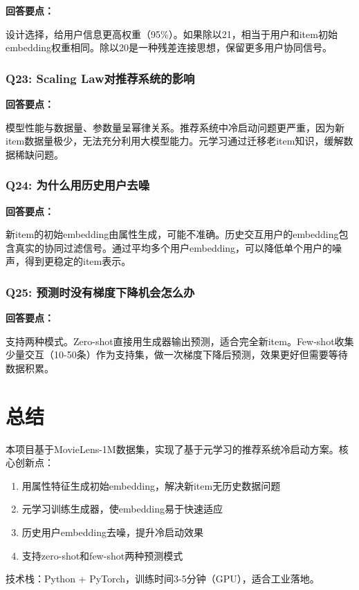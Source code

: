 \documentclass[12pt,a4paper]{article}
\begin{document}
\textbf{回答要点：}

设计选择，给用户信息更高权重（95\%）。如果除以21，相当于用户和item初始embedding权重相同。除以20是一种残差连接思想，保留更多用户协同信号。

\subsubsection{Q23: Scaling Law对推荐系统的影响}

\textbf{回答要点：}

模型性能与数据量、参数量呈幂律关系。推荐系统中冷启动问题更严重，因为新item数据量极少，无法充分利用大模型能力。元学习通过迁移老item知识，缓解数据稀缺问题。

\subsubsection{Q24: 为什么用历史用户去噪}

\textbf{回答要点：}

新item的初始embedding由属性生成，可能不准确。历史交互用户的embedding包含真实的协同过滤信号。通过平均多个用户embedding，可以降低单个用户的噪声，得到更稳定的item表示。

\subsubsection{Q25: 预测时没有梯度下降机会怎么办}

\textbf{回答要点：}

支持两种模式。Zero-shot直接用生成器输出预测，适合完全新item。Few-shot收集少量交互（10-50条）作为支持集，做一次梯度下降后预测，效果更好但需要等待数据积累。

\section{总结}

本项目基于MovieLens-1M数据集，实现了基于元学习的推荐系统冷启动方案。核心创新点：

\begin{enumerate}
    \item 用属性特征生成初始embedding，解决新item无历史数据问题
    \item 元学习训练生成器，使embedding易于快速适应
    \item 历史用户embedding去噪，提升冷启动效果
    \item 支持zero-shot和few-shot两种预测模式
\end{enumerate}

技术栈：Python + PyTorch，训练时间3-5分钟（GPU），适合工业落地。
\end{document}
